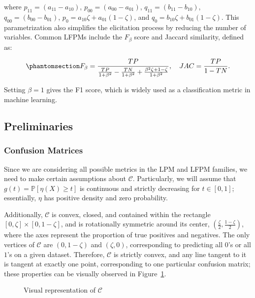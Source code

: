 \documentclass[
  letterpaper,
  numbers=noenddot,
  DIV=11]{scrreprt}
\theoremstyle{definition}
\theoremstyle{plain}
\theoremstyle{plain}
\theoremstyle{remark}
\begin{document}
where \(p_{11} = (a_{11} - a_{10})\), \(p_{00} = (a_{00} - a_{01})\),
\(q_{11} = (b_{11} - b_{10})\), \(q_{00} = (b_{00} - b_{01})\),
\(p_{0} = a_{10} \zeta + a_{01} (1 - \zeta)\), and
\(q_{0} = b_{10} \zeta + b_{01} (1 - \zeta)\). This parametrization also
simplifies the elicitation process by reducing the number of variables.
Common LFPMs include the \(F_\beta\) score and Jaccard similarity,
defined as:

\begin{equation}\phantomsection\label{eq-lfpm_metrics}{F_{\beta} = \frac{TP}{\frac{TP}{1+\beta^{2}} - \frac{TN}{1+\beta^{2}} + \frac{\beta^{2} \zeta + 1 - \zeta}{1+\beta^{2}}}, \quad JAC = \frac{TP}{1 - TN}.}\end{equation}

Setting \(\beta = 1\) gives the F1 score, which is widely used as a
classification metric in machine learning.

\subsection{Preliminaries}\label{sec-me-preliminaries}

\subsubsection*{Confusion Matrices}\label{sec-confusion-matrices}

Since we are considering all possible metrics in the LPM and LFPM
families, we need to make certain assumptions about \(\mathcal{C}\).
Particularly, we will assume that \(g(t) = \mathbb{P}[\eta(X) \geq t]\)
is continuous and strictly decreasing for \(t \in [0, 1]\); essentially,
\(\eta\) has positive density and zero probability.

Additionally, \(\mathcal{C}\) is convex, closed, and contained within
the rectangle \([0, \zeta] \times [0, 1-\zeta]\), and is rotationally
symmetric around its center, \((\frac{\zeta}{2}, \frac{1-\zeta}{2})\),
where the axes represent the proportion of true positives and negatives.
The only vertices of \(\mathcal{C}\) are \((0, 1-\zeta)\) and
\((\zeta, 0)\), corresponding to predicting all \(0\)'s or all \(1\)'s
on a given dataset. Therefore, \(\mathcal{C}\) is strictly convex, and
any line tangent to it is tangent at exactly one point, corresponding to
one particular confusion matrix; these properties can be visually
observed in Figure~\ref{fig-c}.

\begin{figure}


\caption{\label{fig-c}Visual representation of \(\mathcal{C}\)}

\end{figure}%
\end{document}
